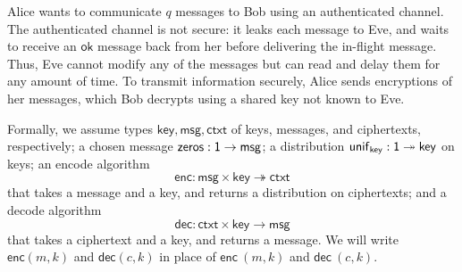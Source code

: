 \newcommand{\key}{\mathsf{key}}
\newcommand{\msg}{\mathsf{msg}}
\newcommand{\ctxt}{\mathsf{ctxt}}
\newcommand{\zeros}{\mathsf{zeros}}
\newcommand{\unif}{\mathsf{unif}}
\newcommand{\enc}{\mathsf{enc}}
\newcommand{\dec}{\mathsf{dec}}
\newcommand{\id}{\mathsf{id}}
\newcommand{\adv}{\mathsf{adv}}
\newcommand{\net}{\mathsf{net}}
\newcommand{\In}{\mathsf{In}}
\newcommand{\Out}{\mathsf{Out}}
\newcommand{\Key}{\mathsf{Key}}
\newcommand{\Send}{\mathsf{Send}}
\newcommand{\Recv}{\mathsf{Recv}}
\newcommand{\Enc}{\mathsf{Enc}}
\newcommand{\Dec}{\mathsf{Dec}}
\newcommand{\LeakMsgRcvd}{\mathsf{LeakMsgRcvd}}
\newcommand{\OkMsg}{\mathsf{OkMsg}}
\newcommand{\LeakCtxt}{\mathsf{LeakCtxt}}
\newcommand{\OkCtxt}{\mathsf{OkCtxt}}

Alice wants to communicate $q$ messages to Bob using an authenticated channel. The authenticated channel is not secure: it leaks each message to Eve, and waits to receive an $\mathsf{ok}$ message back from her before delivering the in-flight message. Thus, Eve cannot modify any of the messages but can read and delay them for any amount of time. To transmit information securely, Alice sends encryptions of her messages, which Bob decrypts using a shared key not known to Eve.

Formally, we assume types $\key, \msg, \ctxt$ of keys, messages, and ciphertexts, respectively; a chosen message $\zeros : \one \rightarrow \msg$; a distribution $\unif_\key : \one \twoheadrightarrow \key$ on keys; an encode algorithm
\[\enc : \msg \times \key \twoheadrightarrow \ctxt\]
that takes a message and a key, and returns a distribution on ciphertexts; and a decode algorithm
\[\dec : \ctxt \times \key \rightarrow \msg\]
that takes a ciphertext and a key, and returns a message. We will write $\enc(m,k)$ and $\dec(c,k)$ in place of $\enc \ (m,k)$ and $\dec \ (c,k)$.

